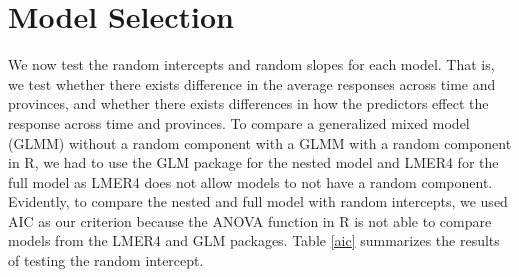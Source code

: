 \section{Model Selection}
We now test the random intercepts and random slopes for each model. That is, we test whether there exists difference in the average responses across time and provinces, and whether there exists differences in how the predictors effect the response across time and provinces.
To compare a generalized mixed model (GLMM) without a random component with a GLMM with a random component in R, we had to use the GLM package for the nested model and LMER4 for the full model as LMER4 does not allow models to not have a random component. Evidently, to compare the nested and full model with random intercepts, we used AIC as our criterion because the ANOVA function in R is not able to compare models from the LMER4 and GLM packages. Table \ref{aic} summarizes the results of testing the random intercept.

